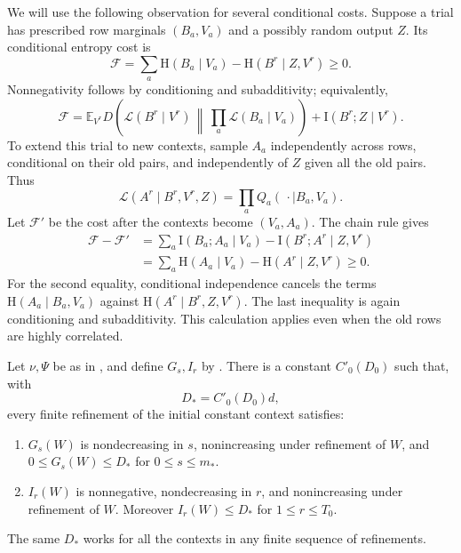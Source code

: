 We will use the following observation for several conditional costs.
Suppose a trial has prescribed row marginals $(B_a,V_a)$ and a possibly
random output $Z$.  Its conditional entropy cost is
\[
 \mathcal F=\sum_a\mathrm H(B_a\mid V_a)
                    -\mathrm H(B^r\mid Z,V^r)\ge0.
\]
Nonnegativity follows by conditioning and subadditivity; equivalently,
\[
 \mathcal F=
 \mathbb E_{V^r}D\!\left(\mathcal L(B^r\mid V^r)
              \,\middle\|\,\prod_a\mathcal L(B_a\mid V_a)\right)
       +\mathrm I(B^r;Z\mid V^r).
\]
To extend this trial to new contexts, sample $A_a$ independently across
rows, conditional on their old pairs, and independently of $Z$ given all
the old pairs.  Thus
\[
 \mathcal L(A^r\mid B^r,V^r,Z)
          =\prod_a Q_a(\,\cdot\mid B_a,V_a).
\]
Let $\mathcal F'$ be the cost after the contexts become $(V_a,A_a)$.
The chain rule gives
\begin{equation}
\label{entropy-foundations:refinement-identity}
\begin{split}
 \mathcal F-\mathcal F'
 &=\sum_a\mathrm I(B_a;A_a\mid V_a)
      -\mathrm I(B^r;A^r\mid Z,V^r)\\
 &=\sum_a\mathrm H(A_a\mid V_a)
      -\mathrm H(A^r\mid Z,V^r)\ge0.
\end{split}
\end{equation}
For the second equality, conditional independence cancels the terms
$\mathrm H(A_a\mid B_a,V_a)$ against
$\mathrm H(A^r\mid B^r,Z,V^r)$.  The last inequality is again conditioning
and subadditivity.  This calculation applies even when the old rows are
highly correlated.

\begin{lemma}
\label{entropy-foundations:context-bounds}
Let $\nu,\Psi$ be as in , and define
$G_s,I_r$ by
.
There is a constant $C'_0(D_0)$ such that, with
\begin{equation}
\label{entropy-foundations:D-star}
 D_*=C'_0(D_0)d,
\end{equation}
every finite refinement of the initial constant context satisfies:
\begin{enumerate}[label=\textup{(\roman*)},leftmargin=*]
\item $G_s(W)$ is nondecreasing in $s$, nonincreasing under refinement of
$W$, and $0\le G_s(W)\le D_*$ for $0\le s\le m_*$.
\item $I_r(W)$ is nonnegative, nondecreasing in $r$, and nonincreasing
under refinement of $W$.  Moreover $I_r(W)\le D_*$ for $1\le r\le T_0$.
\end{enumerate}
The same $D_*$ works for all the contexts in any finite sequence of
refinements.
\end{lemma}

